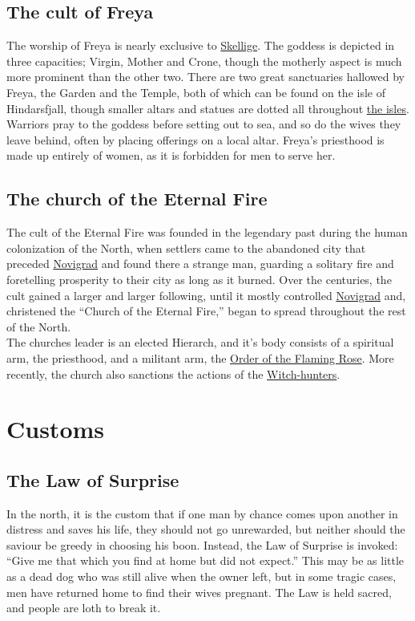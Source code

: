 \documentclass[parskip=full,11pt,%
footheight=38pt]{scrreport}
\begin{document}
\subsection{The cult of Freya}\label{religion:freya}
The worship of Freya is nearly exclusive to \hyperref[region:skellige]{Skellige}. The goddess is depicted
in three capacities; Virgin, Mother and Crone, though the motherly aspect is much more prominent than the other two.
There are two great sanctuaries hallowed by Freya, the Garden and the Temple, both of which can be found on the 
isle of Hindarsfjall, though smaller altars and statues are dotted all throughout \hyperref[region:skellige]{the isles}.
Warriors pray to the goddess before setting out to sea, and so do the wives they leave behind, often by placing offerings
on a local altar. Freya's priesthood is made up entirely of women, as it is forbidden for men to serve her.

\subsection{The church of the Eternal Fire}\label{religion:eternal_fire}
The cult of the Eternal Fire was founded in the legendary past during the human colonization of the North, 
when settlers came to the abandoned city that preceded \hyperref[city:novigrad]{Novigrad} and found there a
strange man, guarding a solitary fire and foretelling prosperity to their city as long as it burned. Over the
centuries, the cult gained a larger and larger following, until it mostly controlled \hyperref[city:novigrad]{Novigrad}
and, christened the ``Church of the Eternal Fire,'' began to spread throughout the rest of the North.
\\[2ex]
The churches leader is an elected Hierarch, and it's body consists of a spiritual arm, the priesthood, and a 
militant arm, the \hyperref[group:flaming-rose]{Order of the Flaming Rose}. More recently, the church also 
sanctions the actions of the \hyperref[profession:witch_hunters]{Witch-hunters}.

\section{Customs}

\subsection{The Law of Surprise}
In the north, it is the custom that if one man by chance comes upon another in distress and saves his life, they should not go unrewarded, but neither
should the saviour be greedy in choosing his boon. Instead, the Law of Surprise is invoked: ``Give me that which you find at home but did not expect.''
This may be as little as a dead dog who was still alive when the owner left, but in some tragic cases, men have returned home to find their wives pregnant.
The Law is held sacred, and people are loth to break it.
\end{document}
